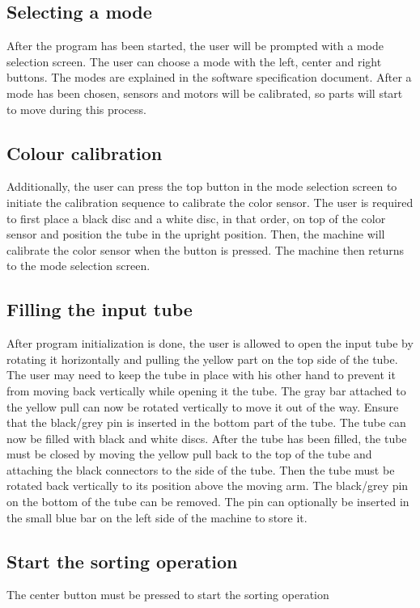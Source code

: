 \documentclass[a4paper,oneside,11pt]{article}
\begin{document}
\subsection{Selecting a mode}
After the program has been started, the user will be prompted with a mode selection screen. The user can choose a mode with the left, center and right buttons. The modes are explained in the software specification document. After a mode has been chosen, sensors and motors will be calibrated, so parts will start to move during this process.

\subsection{Colour calibration}
Additionally, the user can press the top button in the mode selection screen to initiate the calibration sequence to calibrate the color sensor. The user is required to first place a black disc and a white disc, in that order, on top of the color sensor and position the tube in the upright position. Then, the machine will calibrate the color sensor when the button is pressed. The machine then returns to the mode selection screen.

\subsection{Filling the input tube}
After program initialization is done, the user is allowed to open the input tube by rotating it horizontally and pulling the yellow part on the top side of the tube. The user may need to keep the tube in place with his other hand to prevent it from moving back vertically while opening it the tube. The gray bar attached to the yellow pull can now be rotated vertically to move it out of the way. Ensure that the black/grey pin is inserted in the bottom part of the tube. The tube can now be filled with black and white discs. After the tube has been filled, the tube must be closed by moving the yellow pull back to the top of the tube and attaching the black connectors to the side of the tube. Then the tube must be rotated back vertically to its position above the moving arm. The black/grey pin on the bottom of the tube can be removed. The pin can optionally be inserted in the small blue bar on the left side of the machine to store it.

\subsection{Start the sorting operation}
The center button must be pressed to start the sorting operation
\end{document}
